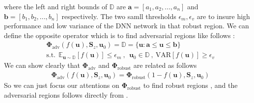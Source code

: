 where the left and right bounds of $\mathbb{D}$ are $\mathbf{a} = [a_{1},a_{2},...,a_{n}]$ and $\mathbf{b} = [b_{1},b_{2},...,b_{n}]$  respectively. The two samll thresholds $\epsilon_{m},\epsilon_{v}$ are to insure high performance and low variance of the DNN network in that robust region. We can define the opposite operator which is to find adversarial regions like follows :
\begin{equation}
\begin{aligned} 
& \mathbf{\Phi}_{\text{adv}}(f(\mathbf{u}),\mathbf{S}_{z},\mathbf{u}_{0}) = \mathbb{D} = \{\mathbf{u}: \mathbf{a} \leq \mathbf{u} \leq \mathbf{b}\} \\
 & \text{s.t.}~~ \mathbb{E}_{\mathbf{u}\sim \mathbb{D}} [f(\mathbf{u})] \leq \epsilon_{m}~, ~~ \mathbf{u}_{0} \in \mathbb{D} ~, ~ \text{VAR}[f(\mathbf{u})] \ge \epsilon_{v}
\label{eq:phi-adv-sup}
\end{aligned}
\end{equation}
We can show clearly that $\mathbf{\Phi}_{\text{adv}}$ and $\mathbf{\Phi}_{\text{robust}}$ are related as follows 
\begin{equation}
\begin{aligned} 
& \mathbf{\Phi}_{\text{adv}}(f(\mathbf{u}),\mathbf{S}_{z},\mathbf{u}_{0}) = \mathbf{\Phi}_{\text{robust}}(1-f(\mathbf{u}),\mathbf{S}_{z},\mathbf{u}_{0})
\label{eq:phi-adv-robust-sup}
\end{aligned}
\end{equation}
So we can just focus our attentions on $\mathbf{\Phi}_{\text{robust}}$ to find robust regions , and the adversarial regions follows directly from \eqLabel{\ref{eq:phi-adv-robust-sup}}.
